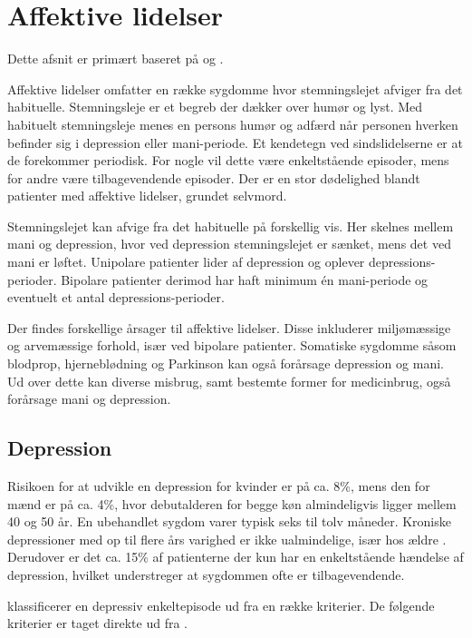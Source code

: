 
\section{Affektive lidelser}\label{sec:affektivelidelser}
Dette afsnit er primært baseret på \citet{misc:affektivelidelser, misc:netpsykdepression, misc:netpsykmani} og \citet{havemann2010grundbog}.

Affektive lidelser omfatter en række sygdomme hvor stemningslejet afviger fra det habituelle.
Stemningsleje er et begreb der dækker over humør og lyst.
Med habituelt stemningsleje menes en persons humør og adfærd når personen hverken befinder sig i depression eller mani-periode.
Et kendetegn ved sindslidelserne er at de forekommer periodisk.
For nogle vil dette være enkeltstående episoder, mens for andre være tilbagevendende episoder.
Der er en stor dødelighed blandt patienter med affektive lidelser, grundet selvmord.

Stemningslejet kan afvige fra det habituelle på forskellig vis.
Her skelnes mellem mani og depression, hvor ved depression stemningslejet er sænket, mens det ved mani er løftet.
Unipolare patienter lider af depression og oplever depressions-perioder.
Bipolare patienter derimod har haft minimum én mani-periode og eventuelt et antal depressions-perioder.

Der findes forskellige årsager til affektive lidelser. 
Disse inkluderer miljømæssige og arvemæssige forhold, især ved bipolare patienter.
Somatiske sygdomme såsom blodprop, hjerneblødning og Parkinson kan også forårsage depression og mani.
Ud over dette kan diverse misbrug, samt bestemte former for medicinbrug, også forårsage mani og depression.

\subsection{Depression}
Risikoen for at udvikle en depression for kvinder er på ca. 8\%, mens den for mænd er på ca. 4\%, hvor debutalderen for begge køn almindeligvis ligger mellem 40 og 50 år.
En ubehandlet sygdom varer typisk seks til tolv måneder.
Kroniske depressioner med op til flere års varighed er ikke ualmindelige, især hos ældre .
Derudover er det ca. 15\% af patienterne der kun har en enkeltstående hændelse af depression, hvilket understreger at sygdommen ofte er tilbagevendende.\citep{misc:affektivelidelser}

 klassificerer en depressiv enkeltepisode ud fra en række kriterier.
De følgende kriterier er taget direkte ud fra \citet{misc:netpsykdepression}.

